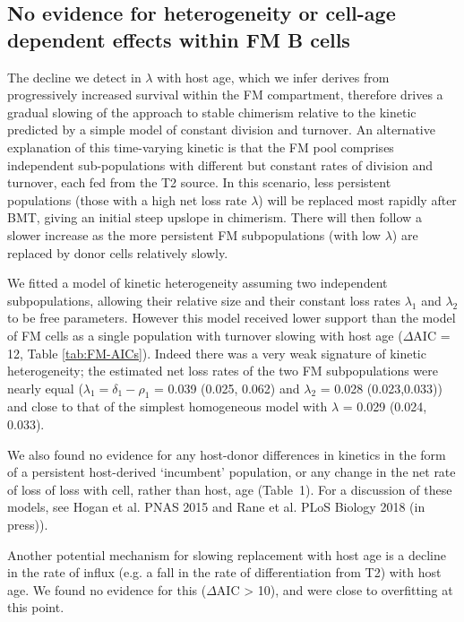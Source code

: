 \documentclass[11pt]{article}
\begin{document}

\subsection*{No evidence for  heterogeneity or cell-age dependent effects within FM B cells}

The decline we detect in $\lambda$ with host age, which we infer derives from progressively increased survival within the FM compartment, therefore drives  a gradual slowing of the approach to stable chimerism relative to the kinetic predicted by a simple model of constant division and turnover. An alternative explanation of this time-varying kinetic is that the FM pool comprises independent sub-populations with different but constant rates of division and turnover, each fed from the T2 source.  In this scenario, less persistent populations (those with a high net loss rate $\lambda$) will be replaced most rapidly after BMT, giving an initial steep upslope in chimerism. There will then follow a slower increase as the more persistent FM subpopulations (with low $\lambda$) are replaced by donor cells relatively slowly.

We fitted a model of kinetic heterogeneity assuming two independent subpopulations, allowing their relative size and their constant loss rates $\lambda_{1}$ and $\lambda_{2}$ to be free parameters. However this model received lower support than the model of FM cells as a single population with turnover slowing with host age ($\Delta$AIC = 12, Table \ref{tab:FM-AICs}).   Indeed there was a very weak signature of kinetic heterogeneity;  the estimated net loss rates of the two FM subpopulations  were nearly equal  ($\lambda_{1} =\delta_{1} -\rho_{1}$ = 0.039 (0.025, 0.062) and  $\lambda_{2}$ = 0.028 (0.023,0.033)) and close to that of the simplest homogeneous model with $\lambda$ = 0.029 (0.024, 0.033).

We also found no evidence for any host-donor differences in kinetics in the form of a persistent host-derived `incumbent' population, or any change in the net rate of loss of loss with cell, rather than host, age (Table~1). For a discussion of these models, see Hogan et al. PNAS 2015 and Rane et al. PLoS Biology 2018 (in press)). 

Another potential mechanism for slowing replacement with host age is a decline in the rate of influx (e.g. a fall in the rate of differentiation from T2) with host age. We found no evidence for this ($\Delta$AIC > 10), and were close to overfitting at this point.
\end{document}

